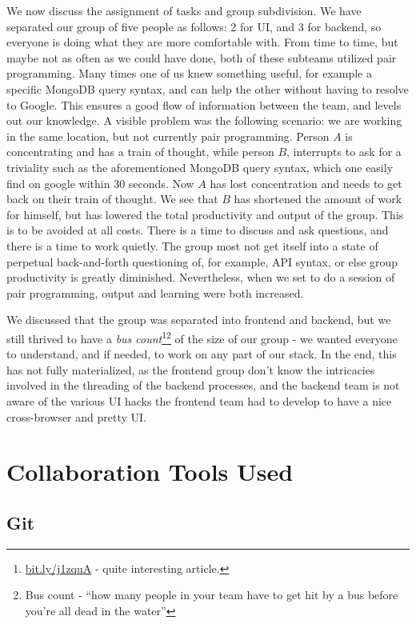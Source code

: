 \documentclass{report}
\begin{document}
		We now discuss the assignment of tasks and group subdivision. We have separated our group of five people as follows: 2 for UI, and 3 for backend, so everyone is doing what they are more comfortable with. From time to time, but maybe not as often as we could have done, both of these subteams utilized pair programming. Many times one of us knew something useful, for example a specific MongoDB query syntax, and can help the other without having to resolve to Google. This ensures a good flow of information between the team, and levels out our knowledge. A visible problem was the following scenario: we are working in the same location, but not currently pair programming. Person $A$ is concentrating and has a train of thought, while person $B$, interrupts to ask for a triviality such as the aforementioned MongoDB query syntax, which one easily find on google within 30 seconds. Now $A$ has lost concentration and needs to get back on their train of thought. We see that $B$ has shortened the amount of work for himself, but has lowered the total productivity and output of the group. This is to be avoided at all costs. There is a time to discuss and ask questions, and there is a time to work quietly. The group most not get itself into a state of perpetual back-and-forth questioning of, for example, API syntax, or else group productivity is greatly diminished. Nevertheless, when we set to do a session of pair programming, output and learning were both increased.
		
		 We discussed that the group was separated into frontend and backend, but we still thrived to have a \emph{bus count}\footnote{\url{bit.ly/j1zquA} - quite interesting article.}\footnote{Bus count - ``how many people in your team have to get hit by a bus before you’re all dead in the water''} of the size of our group - we wanted everyone to understand, and if needed, to work on any part of our stack. In the end, this has not fully materialized, as the frontend group don't know the intricacies involved in the threading of the backend processes, and the backend team is not aware of the various UI hacks the frontend team had to develop to have a nice cross-browser and pretty UI.
		
		
		\section{Collaboration Tools Used}
		
			\subsection{Git}
		
\end{document}
